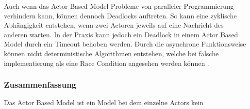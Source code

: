 Auch wenn das Actor Based Model Probleme von paralleler Programmierung verhindern kann, können dennoch Deadlocks auftreten. So kann eine zyklische Abhängigkeit entstehen, wenn zwei Actoren jeweils auf eine Nachricht des anderen warten. In der Praxis kann jedoch ein Deadlock in einem Actor Based Model durch ein Timeout behoben werden. Durch die asynchrone Funktionsweise können nicht deterministische Algorithmen entstehen, welche bei falsche implementierung als eine Race Condition angesehen werden können \cite[]{Erb2012}. 


\subsubsection{Zusammenfassung}
Das Actor Based Model ist ein Model bei dem einzelne Actors kein